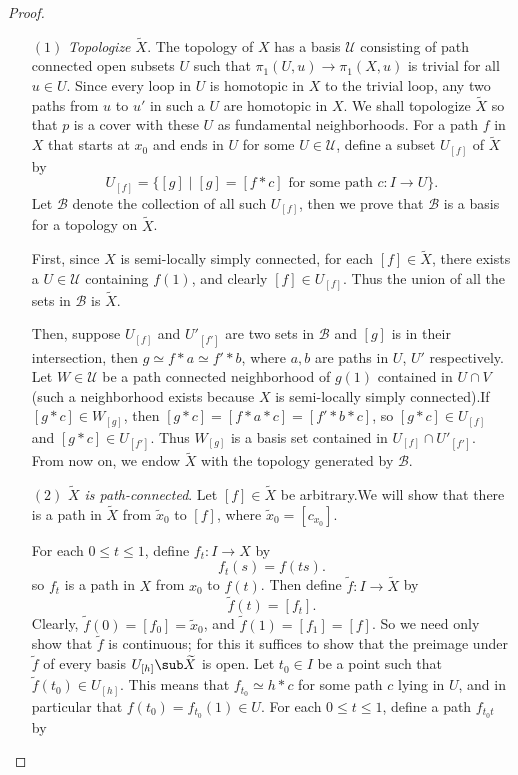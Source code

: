 \begin{proof}
\begin{itemize}
\item[$(1)$] \textit{Topologize $\widetilde{X}$}. The topology of $X$ has a basis $\mathcal{U}$ consisting of path connected open subsets $U$ such that $\pi_1(U,u)\to\pi_1(X,u)$ is trivial for all $u\in U$. Since every loop in $U$ is homotopic in $X$ to the trivial loop, any two paths from $u$ to $u'$ in such a $U$ are homotopic in $X$. We shall topologize $\widetilde{X}$ so that $p$ is a cover with these $U$ as fundamental neighborhoods. For a path $f$ in $X$ that starts at $x_0$ and ends in $U$ for some $U\in\mathcal{U}$, define a subset $U_{[f]}$ of $\widetilde{X}$ by
\[U_{[f]}=\{[g]\mid [g]=[f\ast c]\text{ for some path }c:I\to U\}.\]
Let $\mathcal{B}$ denote the collection of all such $U_{[f]}$, then we prove that $\mathcal{B}$ is a basis for a topology on $\widetilde{X}$.\par
First, since $X$ is semi-locally simply connected, for each $[f]\in\widetilde{X}$, there exists a $U\in\mathcal{U}$ containing $f(1)$, and clearly $[f]\in U_{[f]}$. Thus the union of all the sets in $\mathcal{B}$ is $\widetilde{X}$.\par
Then, suppose $U_{[f]}$ and $U'_{[f']}$ are two sets in $\mathcal{B}$ and $[g]$ is in their intersection, then $g\simeq f\ast a\simeq f'\ast b$, where $a,b$ are paths in $U$, $U'$ respectively. Let $W\in\mathcal{U}$ be a path connected neighborhood of $g(1)$ contained in $U\cap V$ (such a neighborhood exists because $X$ is semi-locally simply connected).If $[g\ast c]\in W_{[g]}$, then $[g\ast c]=[f\ast a\ast c]=[f'\ast b\ast c]$, so $[g\ast c]\in U_{[f]}$ and $[g\ast c]\in U_{[f']}$. Thus $W_{[g]}$ is a basis set contained in $U_{[f]}\cap U'_{[f']}$. From now on, we endow $\widetilde{X}$ with the topology generated by $\mathcal{B}$.
\item[$(2)$] \textit{$\widetilde{X}$ is path-connected}. Let $[f]\in\widetilde{X}$ be arbitrary.We will show that there is a path in $\widetilde{X}$ from $\widetilde{x}_0$ to $[f]$, where $\widetilde{x}_0=[c_{x_0}]$.\par
For each $0\leq t\leq 1$, define $f_t:I\to X$ by
\[f_t(s)=f(ts).\]
so $f_t$ is a path in $X$ from $x_0$ to $f(t)$. Then define $\widetilde{f}:I\to\widetilde{X}$ by
\[\widetilde{f}(t)=[f_t].\]
Clearly, $\widetilde{f}(0)=[f_0]=\widetilde{x}_0$, and $\widetilde{f}(1)=[f_1]=[f]$. So we need only show that $\widetilde{f}$ is continuous; for this it suffices to show that the preimage under $\widetilde{f}$ of every basis $U_{[h]}\sub\widetilde{X}$ is open. Let $t_0\in I$ be a point such that $\widetilde{f}(t_0)\in U_{[h]}$. This means that $f_{t_0}\simeq h\ast c$ for some path $c$ lying in $U$, and in particular that $f(t_0)=f_{t_0}(1)\in U$. For each $0\leq t\leq1$, define a path $f_{t_0t}$ by

\end{itemize}
\end{proof}
